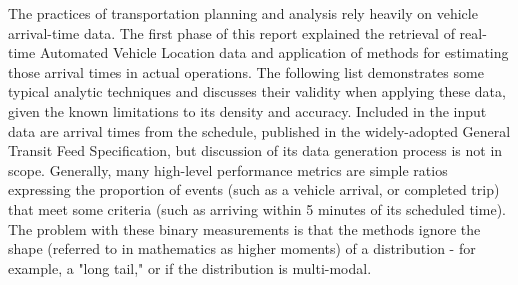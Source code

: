 \documentclass[12pt,journal,compsoc]{IEEEtran}
\begin{document}
The practices of transportation planning and analysis rely heavily on vehicle arrival-time data. The first phase of this report explained the retrieval of real-time Automated Vehicle Location data and application of methods for estimating those arrival times in actual operations. The following list demonstrates some typical analytic techniques and discusses their validity when applying these data, given the known limitations to its density and accuracy. Included in the input data are arrival times from the schedule, published in the widely-adopted General Transit Feed Specification, but discussion of its data generation process is not in scope. Generally, many high-level performance metrics are simple ratios expressing the proportion of events (such as a vehicle arrival, or completed trip) that meet some criteria (such as arriving within 5 minutes of its scheduled time). The problem with these binary measurements is that the methods ignore the shape (referred to in mathematics as higher moments) of a distribution - for example, a "long tail," or if the distribution is multi-modal.
\end{document}
